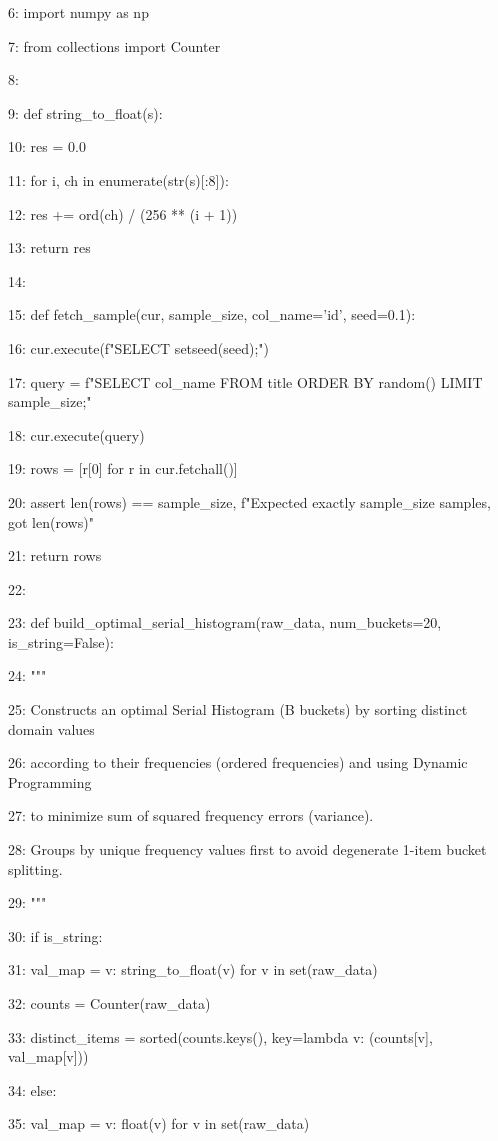 \documentclass[11pt,a4paper]{article}
\begin{document}
6: import numpy as np

7: from collections import Counter

8:

9: def string\_to\_float(s):

10:     res = 0.0

11:     for i, ch in enumerate(str(s)[:8]):

12:         res += ord(ch) / (256 ** (i + 1))

13:     return res

14:

15: def fetch\_sample(cur, sample\_size, col\_name='id', seed=0.1):

16:     cur.execute(f"SELECT setseed({seed});")

17:     query = f"SELECT {col\_name} FROM title ORDER BY random() LIMIT {sample\_size};"

18:     cur.execute(query)

19:     rows = [r[0] for r in cur.fetchall()]

20:     assert len(rows) == sample\_size, f"Expected exactly {sample\_size} samples, got {len(rows)}"

21:     return rows

22:

23: def build\_optimal\_serial\_histogram(raw\_data, num\_buckets=20, is\_string=False):

24:     """

25:     Constructs an optimal Serial Histogram (B buckets) by sorting distinct domain values

26:     according to their frequencies (ordered frequencies) and using Dynamic Programming

27:     to minimize sum of squared frequency errors (variance).

28:     Groups by unique frequency values first to avoid degenerate 1-item bucket splitting.

29:     """

30:     if is\_string:

31:         val\_map = {v: string\_to\_float(v) for v in set(raw\_data)}

32:         counts = Counter(raw\_data)

33:         distinct\_items = sorted(counts.keys(), key=lambda v: (counts[v], val\_map[v]))

34:     else:

35:         val\_map = {v: float(v) for v in set(raw\_data)}
\end{document}
